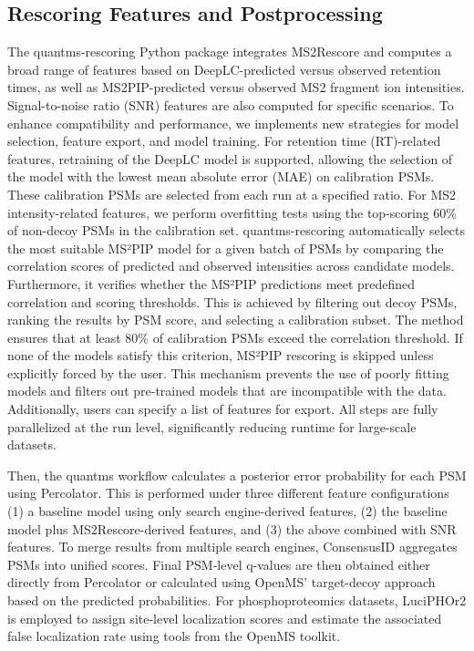 \documentclass[12pt]{article}
\begin{document}
\subsection{Rescoring Features and Postprocessing}
 The quantms-rescoring Python package integrates MS2Rescore and computes a broad range of features based on DeepLC-predicted versus observed retention times, as well as MS2PIP-predicted versus observed MS2 fragment ion intensities. Signal-to-noise ratio (SNR) features are also computed for specific scenarios. To enhance compatibility and performance, we implements new strategies for model selection, feature export, and model training. For retention time (RT)-related features, retraining of the DeepLC model is supported, allowing the selection of the model with the lowest mean absolute error (MAE) on calibration PSMs. These calibration PSMs are selected from each run at a specified ratio. For MS2 intensity-related features, we perform overfitting tests using the top-scoring 60\% of non-decoy PSMs in the calibration set. quantms-rescoring automatically selects the most suitable MS²PIP model for a given batch of PSMs by comparing the correlation scores of predicted and observed intensities across candidate models. Furthermore, it verifies whether the MS²PIP predictions meet predefined correlation and scoring thresholds. This is achieved by filtering out decoy PSMs, ranking the results by PSM score, and selecting a calibration subset. The method ensures that at least 80\% of calibration PSMs exceed the correlation threshold. If none of the models satisfy this criterion, MS²PIP rescoring is skipped unless explicitly forced by the user. This mechanism prevents the use of poorly fitting models and filters out pre-trained models that are incompatible with the data. Additionally, users can specify a list of features for export. All steps are fully parallelized at the run level, significantly reducing runtime for large-scale datasets.
 
 Then, the quantms workflow calculates a posterior error probability for each PSM using Percolator. This is performed under three different feature configurations (1) a baseline model using only search engine-derived features, (2) the baseline model plus MS2Rescore-derived features, and (3) the above combined with SNR features. To merge results from multiple search engines, ConsensusID aggregates PSMs into unified scores. Final PSM-level q-values are then obtained either directly from Percolator or calculated using OpenMS' target-decoy approach based on the predicted probabilities. For phosphoproteomics datasets, LuciPHOr2 is employed to assign site-level localization scores and estimate the associated false localization rate using tools from the OpenMS toolkit.
\end{document}
